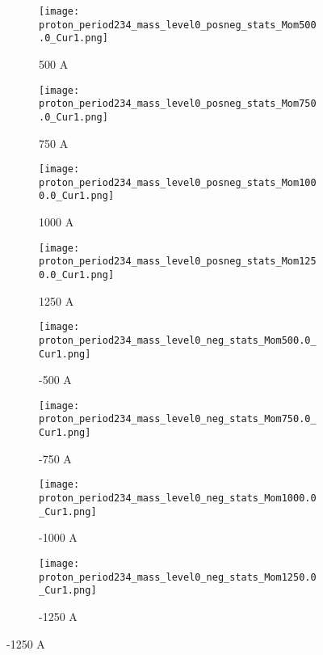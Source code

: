  \begin{figure}[h]	
 \centering   
            \begin{subfigure}[b]{0.24\textwidth}
            \centering
            \texttt{[image: proton\_period234\_mass\_level0\_posneg\_stats\_Mom500.0\_Cur1.png]}
            \caption{500 A}
            \label{fig_mproton500}
            \end{subfigure}
             \hfill   
            \begin{subfigure}[b]{0.24\textwidth}
            \centering
            \texttt{[image: proton\_period234\_mass\_level0\_posneg\_stats\_Mom750.0\_Cur1.png]}
            \caption{750 A}
            \label{fig_mproton750}
            \end{subfigure}
             \hfill   
            \begin{subfigure}[b]{0.24\textwidth}
            \centering
            \texttt{[image: proton\_period234\_mass\_level0\_posneg\_stats\_Mom1000.0\_Cur1.png]}
            \caption{1000 A}
            \label{fig_mproton1000}
            \end{subfigure}
             \hfill                             
             \begin{subfigure}[b]{0.24\textwidth}
            \centering
            \texttt{[image: proton\_period234\_mass\_level0\_posneg\_stats\_Mom1250.0\_Cur1.png]}
            \caption{1250 A}
            \label{fig_mproton1250}
            \end{subfigure}
            
                        \begin{subfigure}[b]{0.24\textwidth}
            \centering
            \texttt{[image: proton\_period234\_mass\_level0\_neg\_stats\_Mom500.0\_Cur1.png]}
            \caption{-500 A}
            \label{fig_mproton-500}
            \end{subfigure}
             \hfill   
            \begin{subfigure}[b]{0.24\textwidth}
            \centering
            \texttt{[image: proton\_period234\_mass\_level0\_neg\_stats\_Mom750.0\_Cur1.png]}
            \caption{-750 A}
            \label{fig_mproton-750}
            \end{subfigure}
             \hfill   
            \begin{subfigure}[b]{0.24\textwidth}
            \centering
            \texttt{[image: proton\_period234\_mass\_level0\_neg\_stats\_Mom1000.0\_Cur1.png]}
            \caption{-1000 A}
            \label{fig_mproton-1000}
            \end{subfigure}
             \hfill                             
             \begin{subfigure}[b]{0.24\textwidth}
            \centering
            \texttt{[image: proton\_period234\_mass\_level0\_neg\_stats\_Mom1250.0\_Cur1.png]}
            \caption{-1250 A}
            \label{fig_mproton-1250}
            \end{subfigure}
            

\end{figure}
